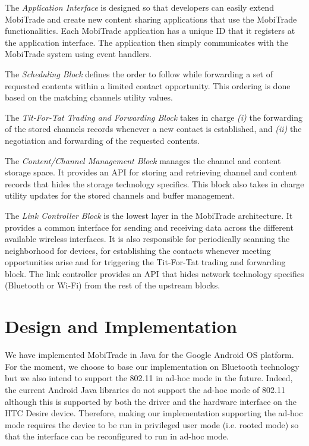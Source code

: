 The \textit{Application Interface} is designed so that developers can easily extend MobiTrade and create new content sharing applications that use the MobiTrade functionalities. Each MobiTrade application has a unique ID that it registers at the application interface. The application then simply communicates with the MobiTrade system using event handlers.

The \textit{Scheduling Block} defines the order to follow while forwarding a set of requested contents within a limited contact opportunity. This ordering is done based on the matching channels utility values.

The \textit{Tit-For-Tat Trading and Forwarding Block} takes in charge \emph{(i)} the forwarding of the stored channels records whenever a new contact is established, and \emph{(ii)} the negotiation and forwarding of the requested contents.

The \textit{Content/Channel Management Block} manages the channel and content storage space. It provides an API for storing and retrieving channel and content records that hides the storage technology specifics. This block also takes in charge utility updates for the stored channels and buffer management.

The \textit{Link Controller Block} is the lowest layer in the MobiTrade architecture. It provides a common interface for sending and receiving data across the different available wireless interfaces. It is also responsible for periodically scanning the neighborhood for devices, for establishing the contacts whenever meeting opportunities arise and for triggering the Tit-For-Tat trading and forwarding block. The link controller provides an API that hides network technology specifics (Bluetooth or Wi-Fi) from the rest of the upstream blocks.

\section{Design and Implementation}
\label{MobiTradeDesignAndImplementation}

We have implemented MobiTrade in Java for the Google Android OS platform. For the moment, we choose to base our implementation on Bluetooth technology but we also intend to support the 802.11 in ad-hoc mode in the future. Indeed, the current Android Java libraries do not support the ad-hoc mode of 802.11 although this is supported by both the driver and the hardware interface on the HTC Desire device. Therefore, making our implementation supporting the ad-hoc mode requires the device to be run in privileged user mode (i.e. rooted mode) so that the interface can be reconfigured to run in ad-hoc mode.

